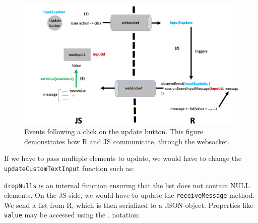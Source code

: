 \documentclass[
]{book}
\newenvironment{Shaded}{\begin{snugshade}}{\end{snugshade}}
\newcommand{\ControlFlowTok}[1]{\textcolor[rgb]{0.13,0.29,0.53}{\textbf{#1}}}
\newcommand{\DataTypeTok}[1]{\textcolor[rgb]{0.13,0.29,0.53}{#1}}
\newcommand{\KeywordTok}[1]{\textcolor[rgb]{0.13,0.29,0.53}{\textbf{#1}}}
\newcommand{\NormalTok}[1]{#1}
\newcommand{\OperatorTok}[1]{\textcolor[rgb]{0.81,0.36,0.00}{\textbf{#1}}}
\newcommand{\OtherTok}[1]{\textcolor[rgb]{0.56,0.35,0.01}{#1}}
\newcommand{\StringTok}[1]{\textcolor[rgb]{0.31,0.60,0.02}{#1}}
\begin{document}
\begin{figure}
\includegraphics[width=20in]{images/survival-kit/shiny-update-inputs} \caption{Events following a click on the update button. This figure demonstrates how R and JS communicate, through the websocket.}\label{fig:shiny-update-inputs}
\end{figure}

If we have to pass multiple elements to update, we would have to change the \texttt{updateCustomTextInput} function such as:

\begin{Shaded}
\end{Shaded}

\texttt{dropNulls} is an internal function ensuring that the list does not contain NULL elements. On the JS side, we would have to update the \texttt{receiveMessage} method. We send a list from R, which is then serialized to a JSON object. Properties like \texttt{value} may be accessed using the . notation:
\end{document}
